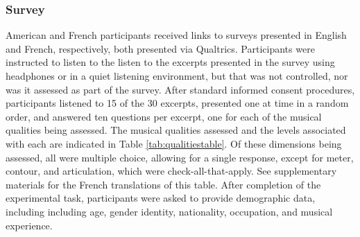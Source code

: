 \documentclass[
  english,
  man,floatsintext]{apa6}
\begin{document}
\hypertarget{survey}{%
\subsubsection{Survey}\label{survey}}

American and French participants received links to surveys presented in English and French, respectively, both presented via Qualtrics. Participants were instructed to listen to the listen to the excerpts presented in the survey using headphones or in a quiet listening environment, but that was not controlled, nor was it assessed as part of the survey. After standard informed consent procedures, participants listened to 15 of the 30 excerpts, presented one at time in a random order, and answered ten questions per excerpt, one for each of the musical qualities being assessed. The musical qualities assessed and the levels associated with each are indicated in Table \ref{tab:qualitiestable}. Of these dimensions being assessed, all were multiple choice, allowing for a single response, except for meter, contour, and articulation, which were check-all-that-apply. See supplementary materials for the French translations of this table. After completion of the experimental task, participants were asked to provide demographic data, including including age, gender identity, nationality, occupation, and musical experience.
\end{document}
